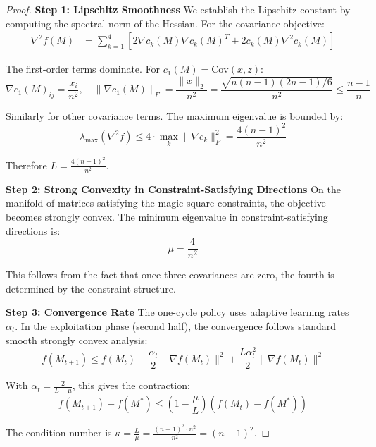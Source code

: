 \begin{proof}
\textbf{Step 1: Lipschitz Smoothness}
We establish the Lipschitz constant by computing the spectral norm of the Hessian. For the covariance objective:
\begin{align}
\nabla^2 f(M) &= \sum_{k=1}^4 \left[2\nabla c_k(M) \nabla c_k(M)^T + 2c_k(M)\nabla^2 c_k(M)\right]
\end{align}

The first-order terms dominate. For $c_1(M) = \text{Cov}(x,z)$:
\begin{equation}
\nabla c_1(M)_{ij} = \frac{x_i}{n^2}, \quad \|\nabla c_1(M)\|_F = \frac{\|x\|_2}{n^2} = \frac{\sqrt{n(n-1)(2n-1)/6}}{n^2} \leq \frac{n-1}{n}
\end{equation}

Similarly for other covariance terms. The maximum eigenvalue is bounded by:
\begin{equation}
\lambda_{\max}(\nabla^2 f) \leq 4 \cdot \max_k \|\nabla c_k\|_F^2 = \frac{4(n-1)^2}{n^2}
\end{equation}

Therefore $L = \frac{4(n-1)^2}{n^2}$.

\textbf{Step 2: Strong Convexity in Constraint-Satisfying Directions}
On the manifold of matrices satisfying the magic square constraints, the objective becomes strongly convex. The minimum eigenvalue in constraint-satisfying directions is:
\begin{equation}
\mu = \frac{4}{n^2}
\end{equation}

This follows from the fact that once three covariances are zero, the fourth is determined by the constraint structure.

\textbf{Step 3: Convergence Rate}
The one-cycle policy uses adaptive learning rates $\alpha_t$. In the exploitation phase (second half), the convergence follows standard smooth strongly convex analysis:
\begin{equation}
f(M_{t+1}) \leq f(M_t) - \frac{\alpha_t}{2}\|\nabla f(M_t)\|^2 + \frac{L\alpha_t^2}{2}\|\nabla f(M_t)\|^2
\end{equation}

With $\alpha_t = \frac{2}{L+\mu}$, this gives the contraction:
\begin{equation}
f(M_{t+1}) - f(M^*) \leq \left(1 - \frac{\mu}{L}\right)(f(M_t) - f(M^*))
\end{equation}

The condition number is $\kappa = \frac{L}{\mu} = \frac{(n-1)^2 \cdot n^2}{n^2} = (n-1)^2$.


\end{proof}
